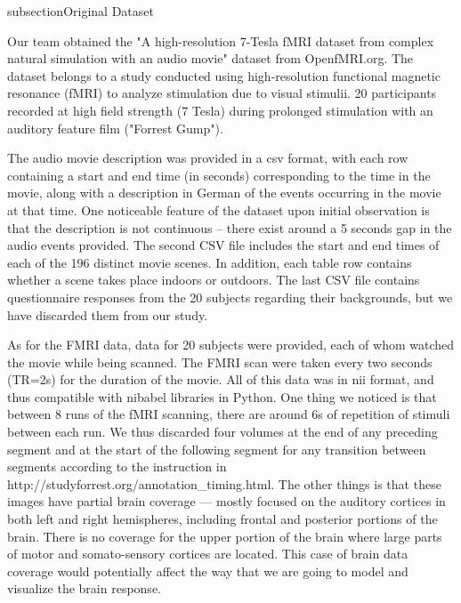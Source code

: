 \par \indent 

subsection{Original Dataset}
\par Our team obtained the "A high-resolution 7-Tesla fMRI dataset from complex natural simulation with an audio movie" dataset from OpenfMRI.org. The dataset belongs to a study conducted using high-resolution functional magnetic resonance (fMRI) to analyze stimulation due to visual stimulii. 20 participants recorded at high field strength (7 Tesla) during prolonged stimulation with an auditory feature film ("Forrest Gump"). 

\par The audio movie description was provided in a csv format, with each row containing a start and end time (in seconds) corresponding to the time in the movie, along with a description in German of the events occurring in the movie at that time. One noticeable feature of the dataset upon initial observation is that the description
is not continuous -- there exist around a 5 seconds gap in the audio events provided. The second CSV file includes the start and end times of each of the 196 distinct movie scenes. In addition, each table row contains whether a scene takes place indoors or outdoors. The last CSV file contains questionnaire responses from the 20 subjects regarding their backgrounds,  but we have discarded them from our study. 

\par As for the FMRI data, data for 20 subjects were provided, each of whom watched the movie while being scanned. The FMRI scan were taken every two seconds (TR=2s) for the duration of the movie. All of this data was in nii format, and thus compatible with nibabel libraries in Python. One thing we noticed is that between 8 runs of the fMRI scanning, there are around 6s of repetition of stimuli between each run. We thus discarded four volumes at the end of any preceding segment and at the start of the following segment for any transition between segments according to the instruction in http://studyforrest.org/annotation\_timing.html. The other things is that these images have partial brain coverage — mostly focused on the auditory cortices in both left and right hemispheres, including frontal and posterior portions of the brain. There is no coverage for the upper portion of the brain where large parts of motor and somato-sensory cortices are located. This case of brain data coverage would potentially affect the way that we are going to model and visualize the brain response.

